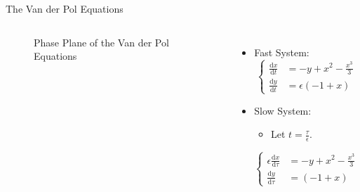 \documentclass[11pt]{beamer}
\newcommand{\dif}{\mathrm{d}}
\begin{document}
\begin{frame}{The Van der Pol Equations}
\begin{columns} 
\begin{figure}
    \centering
{}
    \caption{Phase Plane of the Van der Pol Equations}
\end{figure}


\begin{itemize}
    \item Fast System:
    \begin{equation*} 
        \begin{cases}
        \frac{\dif x}{\dif t}&= -y + x^2 - \frac{x^3}{3}\\
        \frac{\dif y}{\dif t}&=\epsilon (-1+x)
        \end{cases}
        \end{equation*}
\pause
\item Slow System:\\
     \begin{itemize}\item Let $t=\frac{\tau}{\epsilon}$.\end{itemize}
\begin{equation*} 
        \begin{cases}
        \epsilon\frac{\dif x}{\dif \tau} &= -y + x^2 - \frac{x^3}{3}\\ 
        \frac{\dif y}{\dif \tau}&= (-1+x)
        \end{cases}
        \end{equation*}

\end{itemize}
\end{columns}
\end{frame}
\end{document}
